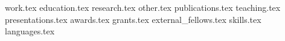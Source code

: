 \documentclass[letterpaper,11pt]{article}
\begin{document}


{work.tex}
{education.tex}
{research.tex}
{other.tex}
{publications.tex}
{teaching.tex}
{presentations.tex}
{awards.tex}
{grants.tex}
{external_fellows.tex}
\sidebyside
    {{skills.tex}}
    {{languages.tex}}
%
\end{document}
